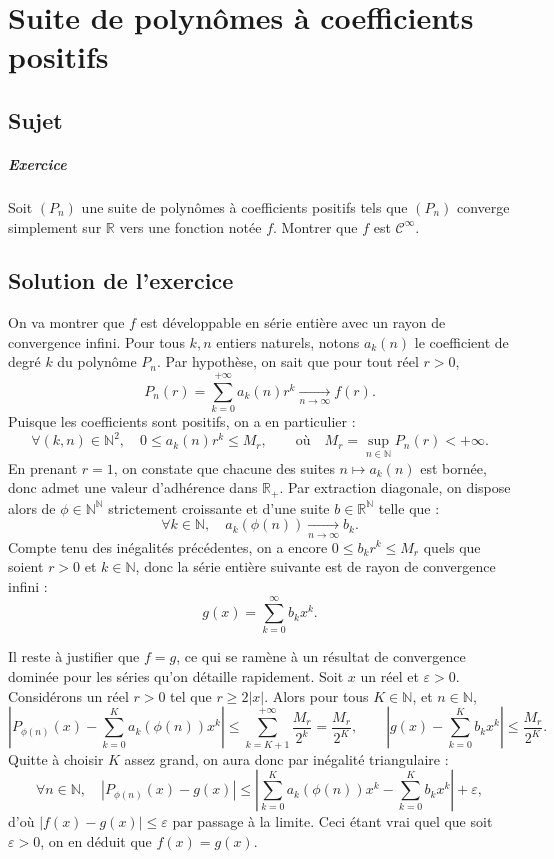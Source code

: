 \chapter{Suite de polynômes à coefficients positifs}

\section{Sujet}

\paragraph{Exercice}
Soit $(P_n)$ une suite de polynômes à coefficients positifs tels que $(P_n)$ converge simplement sur $\mathbb R$ vers une fonction notée $f$. Montrer que $f$ est $\mathscr C^\infty$.

\section{Solution de l'exercice}

On va montrer que $f$ est développable en série entière avec un rayon de convergence infini. Pour tous $k,n$ entiers naturels, notons $a_k(n)$ le coefficient de degré $k$ du polynôme $P_n$. Par hypothèse, on sait que pour tout réel $r > 0$,
\[
P_n(r) = \sum_{k=0}^{+\infty}a_k(n) r^k \xrightarrow[n\to\infty]{} f(r).
\]
Puisque les coefficients sont positifs, on a en particulier :
\[
    \forall (k,n)\in\mathbb N^2,\quad 0 \leqslant a_k(n) r^k \leqslant M_r,
    \qquad\text{où}\quad M_r = \sup_{n\in\mathbb N} P_n(r) < +\infty.
\]
En prenant $r = 1$, on constate que chacune des suites $n \mapsto a_k(n)$ est bornée, donc admet une valeur d'adhérence dans $\mathbb R_+$. Par extraction diagonale, on dispose alors de $\phi \in \mathbb N^{\mathbb N}$ strictement croissante et d'une suite $b \in \mathbb R^\mathbb N$ telle que :
\[
\forall k \in \mathbb N,\quad a_k(\phi(n)) \xrightarrow[n\to\infty]{} b_k.
\]
Compte tenu des inégalités précédentes, on a encore $0 \leqslant b_k r^k \leqslant M_r$ quels que soient $r > 0$ et $k\in \mathbb N$, donc la série entière suivante est de rayon de convergence infini :
\[
    g(x) = \sum_{k=0}^\infty b_k x^k.
\]

Il reste à justifier que $f = g$, ce qui se ramène à un résultat de convergence dominée pour les séries qu'on détaille rapidement. Soit $x$ un réel et $\varepsilon > 0$. 
Considérons un réel $r > 0$ tel que $r \geqslant 2|x|$. Alors pour tous $K \in \mathbb N$, et $n\in \mathbb N$, 
\[
\left|P_{\phi(n)}(x) - \sum_{k=0}^K a_k(\phi(n)) x^k\right| \leqslant \sum_{k=K+1}^{+\infty} \frac{M_r}{2^k} = \frac{M_r}{2^K},
\qquad
\left|g(x) - \sum_{k=0}^K b_k x^k\right| \leqslant \frac{M_r}{2^K}.
\]
Quitte à choisir $K$ assez grand, on aura donc par inégalité triangulaire :
\[
\forall n \in \mathbb N,\quad \left|P_{\phi(n)}(x) - g(x)\right| \leqslant \left|\sum_{k=0}^K a_k(\phi(n))x^k - \sum_{k=0}^K b_k x^k\right| + \varepsilon,
\]
d'où $|f(x)-g(x)| \leqslant \varepsilon$ par passage à la limite. Ceci étant vrai quel que soit $\varepsilon > 0$, on en déduit que $f(x) = g(x)$.

